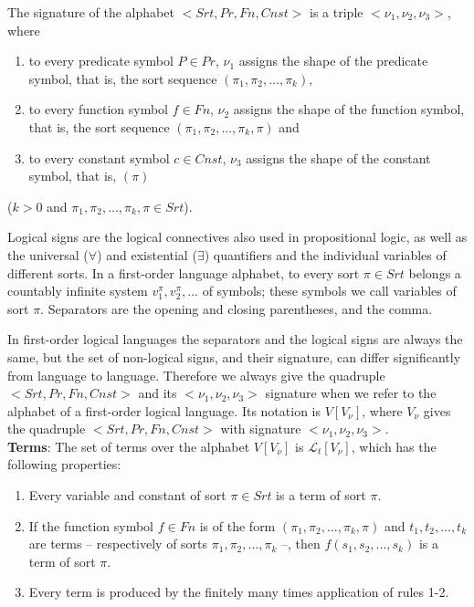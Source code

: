 \documentclass[margin=0px]{article}
\begin{document}
\noindent The signature of the alphabet $<Srt, Pr, Fn, Cnst>$ is a triple $<\nu_{1}, \nu_{2}, \nu_{3}>$, where

\begin{enumerate}
    \item	to every predicate symbol $P \in Pr$, $\nu_{1}$ assigns the shape of the predicate symbol,
          that is, the sort sequence $(\pi_{1}, \pi_{2}, ..., \pi_{k})$,

    \item	to every function symbol $f \in Fn$, $\nu_{2}$ assigns the shape of the function symbol,
          that is, the sort sequence $(\pi_{1}, \pi_{2}, ..., \pi_{k}, \pi)$ and

    \item	to every constant symbol $c \in Cnst$, $\nu_{3}$ assigns the shape of the constant symbol,
          that is, $(\pi)$
\end{enumerate}

\noindent ($k > 0$ and $\pi_{1}, \pi_{2}, ..., \pi_{k}, \pi \in Srt$).

Logical signs are the logical connectives also used in propositional logic, as well as the universal ($\forall$)
and existential ($\exists$) quantifiers and the individual variables of different sorts. In a first-order
language alphabet, to every sort $\pi \in Srt$ belongs a countably infinite system
$v_{1}^{\pi}, v_{2}^{\pi}, ...$ of symbols; these symbols we call variables of sort $\pi$.
Separators are the opening and closing parentheses, and the comma.

In first-order logical languages the separators and the logical signs are always the same, but
the set of non-logical signs, and their signature, can differ significantly from language to language.
Therefore we always give the quadruple $<Srt, Pr, Fn, Cnst>$ and its $<\nu_{1}, \nu_{2}, \nu_{3}>$
signature when we refer to the alphabet of a first-order logical language. Its notation is $V[V_{\nu}]$,
where $V_{\nu}$ gives the quadruple $<Srt, Pr, Fn, Cnst>$ with signature $<\nu_{1}, \nu_{2}, \nu_{3}>$.\\

\noindent \textbf{Terms}: The set of terms over the alphabet $V[V_{\nu}]$ is $\mathcal{L}_{t}[V_{\nu}]$, which
has the following properties:

\begin{enumerate}
    \item	Every variable and constant of sort $\pi \in Srt$ is a term of sort $\pi$.

    \item	If the function symbol $f \in Fn$ is of the form $(\pi_{1}, \pi_{2}, ..., \pi_{k}, \pi)$
          and $t_{1}, t_{2}, ..., t_{k}$ are terms -- respectively of sorts $\pi_{1}, \pi_{2}, ..., \pi_{k}$ --,
          then $f(s_{1}, s_{2}, ..., s_{k})$ is a term of sort $\pi$.

    \item	Every term is produced by the finitely many times application of rules 1-2.
\end{enumerate}
\end{document}
